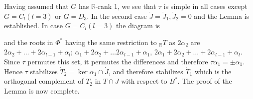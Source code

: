 Having assumed that $G$ has $\mathbb{R}$-rank 1, we see that $\tau$ is
simple in all cases except $G= C_l (l=3)$ or $G=D_3$. In the second
case $\dot{J}= \dot{J}_1, \dot{J}_2=0$ and the Lemma is
established. In case $G= C_l(l=3)$ the diagram is 
\begin{figure}[H]
\end{figure}
\noindent and the roots in $\Phi^*$ having the same restriction to
${}_\mathbb{R} T$ as $2 \alpha_2$ are $2 \alpha_2 + \ldots + 2
\alpha_{l-1} + \alpha_l$; $\alpha_1 + 2 \alpha_2 + \ldots 2
\alpha_{l-1} + \alpha_1$, $2 \alpha_1+ 2 \alpha_2 + \ldots + 2
\alpha_{l-1}+ \alpha_l$. Since $\tau$ permutes this set, it permutes
the differences and therefore $\tau \alpha_1 = \pm \alpha_1$. Hence
$\tau$ stabilizes $\dot{T}_2= \ker \alpha_1 \cap \dot{J}$, and
therefore stabilizes $\dot{T}_1$ which is the orthogonal complement of
$\dot{T}_2$ in $\dot{T} \cap \dot{J}$ with respect to $B^*$. The proof
  of the Lemma is now complete.
